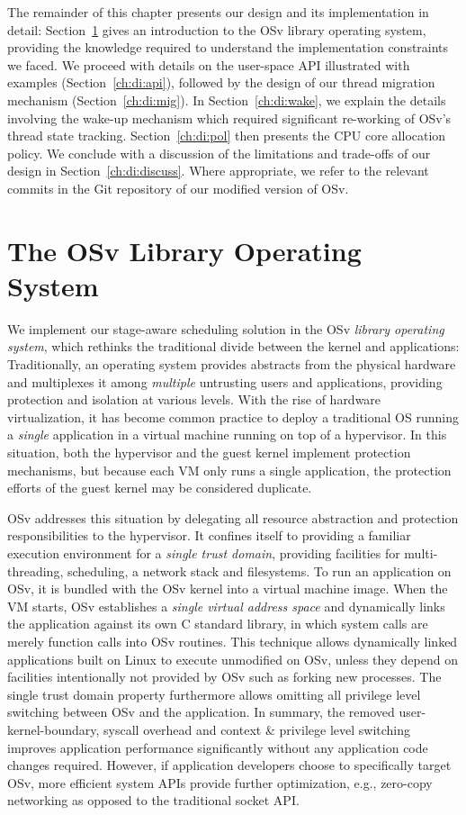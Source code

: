 \documentclass[12pt,a4paper]{book}
\begin{document}
The remainder of this chapter presents our design and its implementation in detail:
Section~\ref{ch:di:osv} gives an introduction to the OSv library operating system, providing the knowledge required to understand the implementation constraints we faced.
We proceed with details on the user-space API illustrated with examples (Section~\ref{ch:di:api}), followed by the design of our thread migration mechanism (Section~\ref{ch:di:mig}).
In Section~\ref{ch:di:wake}, we explain the details involving the wake-up mechanism which required significant re-working of OSv's thread state tracking.
Section~\ref{ch:di:pol} then presents the CPU core allocation policy.
We conclude with a discussion of the limitations and trade-offs of our design in Section~\ref{ch:di:discuss}.
Where appropriate, we refer to the relevant commits in the Git repository of our modified version of OSv.

\section{The OSv Library Operating System}\label{ch:di:osv}
We implement our stage-aware scheduling solution in the OSv \emph{library operating system}, which rethinks the traditional divide between the kernel and applications:
Traditionally, an operating system provides abstracts from the physical hardware and multiplexes it among \emph{multiple} untrusting users and applications, providing protection and isolation at various levels.
With the rise of hardware virtualization, it has become common practice to deploy a traditional OS running a \emph{single} application in a virtual machine running on top of a hypervisor.
In this situation, both the hypervisor and the guest kernel implement protection mechanisms, but because each VM only runs a single application, the protection efforts of the guest kernel may be considered duplicate.~\cite{mirageOS,osvMain}

OSv addresses this situation by delegating all resource abstraction and protection responsibilities to the hypervisor.
It confines itself to providing a familiar execution environment for a \emph{single trust domain}, providing facilities for multi-threading, scheduling, a network stack and filesystems.
To run an application on OSv, it is bundled with the OSv kernel into a virtual machine image.
When the VM starts, OSv establishes a \emph{single virtual address space} and dynamically links the application against its own C standard library, in which system calls are merely function calls into OSv routines.
This technique allows dynamically linked applications built on Linux to execute unmodified on OSv, unless they depend on facilities intentionally not provided by OSv such as forking new processes.
The single trust domain property furthermore allows omitting all privilege level switching between OSv and the application.
In summary, the removed user-kernel-boundary, syscall overhead and context \& privilege level switching improves application performance significantly without any application code changes required.
However, if application developers choose to specifically target OSv, more efficient system APIs provide further optimization, e.g., zero-copy networking as opposed to the traditional socket API.~\cite{osvMain}
\end{document}
